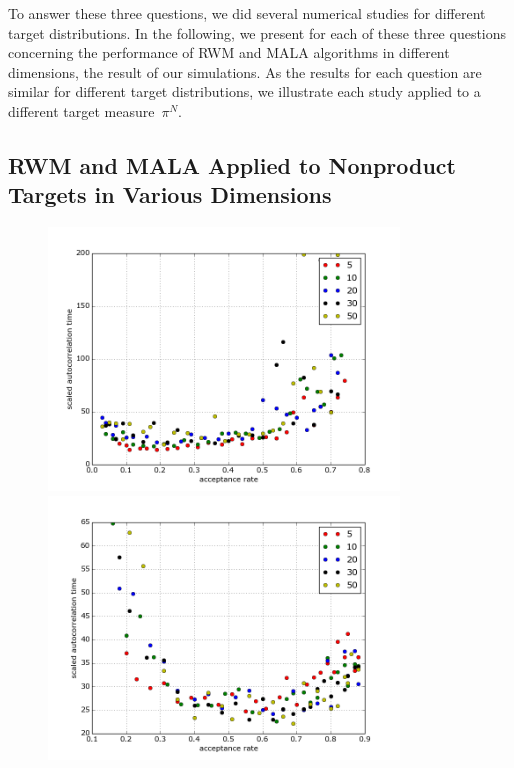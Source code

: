 To answer these three questions, we did several numerical studies for different target distributions. In the following, we present for each of these three questions concerning the performance of RWM and MALA algorithms in different dimensions, the result of our simulations. As the results for each question are similar for different target distributions, we illustrate each study applied to a different target measure~$\pi^N$.


\subsection{RWM and MALA Applied to Nonproduct Targets in Various Dimensions}

\begin{figure}%
 \begin{center} 
  \includegraphics[width=0.83\textwidth]{RWM_ScaledAutocorrelationsDiagramm_MultimodalGaussian-m=2}
  \vspace*{1mm}
  \label{fig:OptimalScaling-RWM-dimensions}
  \vspace*{3mm}
  \includegraphics[width=0.83\textwidth]{MALA_ScaledAutocorrelationsDiagramm_MultimodalGaussian-m=2}

\end{center}
\end{figure}
